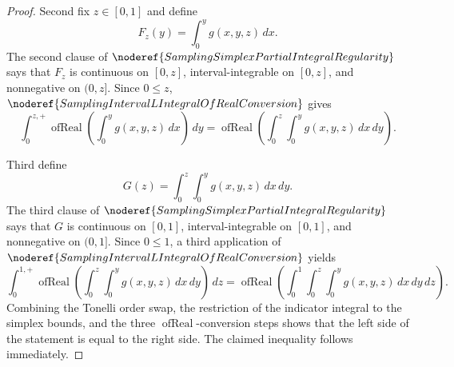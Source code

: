 \begin{proof}
Second fix \(z\in[0,1]\) and define
\[
F_z(y)=\int_0^y g(x,y,z)\,dx .
\]
The second clause of
\(\noderef{SamplingSimplexPartialIntegralRegularity}\) says that \(F_z\) is
continuous on \([0,z]\), interval-integrable on \([0,z]\), and nonnegative on
\((0,z]\).  Since \(0\le z\),
\(\noderef{SamplingIntervalLIntegralOfRealConversion}\) gives
\[
\int_0^{z,+}\operatorname{ofReal}\left(\int_0^y g(x,y,z)\,dx\right)\,dy
=
\operatorname{ofReal}\left(\int_0^z\int_0^y g(x,y,z)\,dx\,dy\right).
\]

Third define
\[
G(z)=\int_0^z\int_0^y g(x,y,z)\,dx\,dy .
\]
The third clause of \(\noderef{SamplingSimplexPartialIntegralRegularity}\)
says that \(G\) is continuous on \([0,1]\), interval-integrable on \([0,1]\),
and nonnegative on \((0,1]\).  Since \(0\le1\), a third application of
\(\noderef{SamplingIntervalLIntegralOfRealConversion}\) yields
\[
\int_0^{1,+}\operatorname{ofReal}\left(\int_0^z\int_0^y
g(x,y,z)\,dx\,dy\right)\,dz
=
\operatorname{ofReal}\left(\int_0^1\int_0^z\int_0^y
g(x,y,z)\,dx\,dy\,dz\right).
\]
Combining the Tonelli order swap, the restriction of the indicator integral to
the simplex bounds, and the three \(\operatorname{ofReal}\)-conversion steps
shows that the left side of the statement is equal to the right side.  The
claimed inequality follows immediately.
\end{proof}
